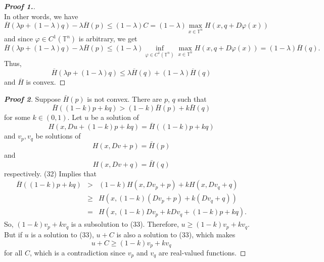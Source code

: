 \documentclass[12pt, oneside]{amsart}  	%
\begin{document}
\begin{proof}[\textbf{Proof 1.}]
\begin{equation*}
\end{equation*}
In other words, we have
\begin{equation*}
\overline{H}\left(\lambda p + (1-\lambda)q\right) - \lambda \overline{H}(p) \leq  (1-\lambda)C = (1-\lambda)\max_{x\in \mathbb{T}^n} H(x,q+D\varphi(x))
\end{equation*}
and since $\varphi\in C^1(\mathbb{T}^n)$ is arbitrary, we get
\begin{equation*}
\overline{H}\left(\lambda p + (1-\lambda)q\right) - \lambda \overline{H}(p)  \leq  (1-\lambda) \inf_{\varphi\in C^1(\mathbb{T}^n)} \max_{x\in \mathbb{T}^n} H(x,q+D\varphi(x)) = (1-\lambda)\overline{H}(q).
\end{equation*}
Thus,
\begin{equation*}
\overline{H}\left(\lambda p + (1-\lambda)q\right)  \leq \lambda \overline{H}(q) + (1-\lambda)\overline{H}(q)
\end{equation*}
and $\overline{H}$ is convex.
\end{proof}

\begin{proof}[\textbf{Proof 2}]
Suppose $\bar{H}(p)$ is not convex.  There are $p$, $q$ such that
	\begin{equation}
		\bar{H}((1-k)p + kq) > (1-k)\bar{H}(p)+k\bar{H}(q)
	\end{equation}
	for some $k\in (0,1)$. Let $u$ be a solution of
	\begin{equation}
		H(x, Du + (1-k)p + kq) = \bar{H}((1-k)p + kq)
	\end{equation}
	and $v_p, v_q$ be solutions of
	$$H(x,Dv + p)= \bar{H}(p)$$
	and $$H(x,Dv + q)= \bar{H}(q)$$
	respectively.
	(32) Implies that
	\begin{eqnarray*}
		\bar{H}((1-k)p + kq)	&>& 	(1-k)H(x,Dv_p + p)+ kH(x,Dv_q + q)\\
						&\ge&	H(x, (1-k)(Dv_p + p) + k(Dv_q +q)) \\
						&=&		H(x, (1-k)Dv_p+ kDv_q + (1-k)p +kq).
	\end{eqnarray*}
	So, $(1-k)v_p + kv_q$ is a subsolution to (33). Therefore, $u \ge (1-k)v_p + kv_q$. But if $u$ is a solution to (33), $u+C$ is also a solution to (33), which makes
	$$ u + C \ge (1-k)v_p + kv_q$$ for all $C$, which is a contradiction since $v_p$ and $v_q$ are real-valued functions.
\end{proof}

\nocite{*}


\end{document}
